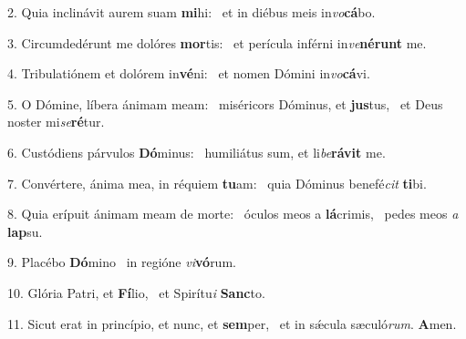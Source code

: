 2. Quia inclinávit aurem suam \textbf{mi}hi: \ast\  et in diébus meis in\textit{vo}\textbf{cá}bo.\

3. Circumdedérunt me dolóres \textbf{mor}tis: \ast\  et perícula inférni in\textit{ve}\textbf{né}\textbf{runt} me.\

4. Tribulatiónem et dolórem in\textbf{vé}ni: \ast\  et nomen Dómini in\textit{vo}\textbf{cá}vi.\

5. O Dómine, líbera ánimam meam: \dag\  miséricors Dóminus, et \textbf{jus}tus, \ast\  et Deus noster mi\textit{se}\textbf{ré}tur.\

6. Custódiens párvulos \textbf{Dó}minus: \ast\  humiliátus sum, et li\textit{be}\textbf{rá}\textbf{vit} me.\

7. Convértere, ánima mea, in réquiem \textbf{tu}am: \ast\  quia Dóminus benefé\textit{cit} \textbf{ti}bi.\

8. Quia erípuit ánimam meam de morte: \dag\  óculos meos a \textbf{lá}crimis, \ast\  pedes meos \textit{a} \textbf{lap}su.\

9. Placébo \textbf{Dó}mino \ast\  in regióne \textit{vi}\textbf{vó}rum.\

10. Glória Patri, et \textbf{Fí}lio, \ast\  et Spirítu\textit{i} \textbf{Sanc}to.\

11. Sicut erat in princípio, et nunc, et \textbf{sem}per, \ast\  et in sǽcula sæculó\textit{rum}. \textbf{A}men.\

